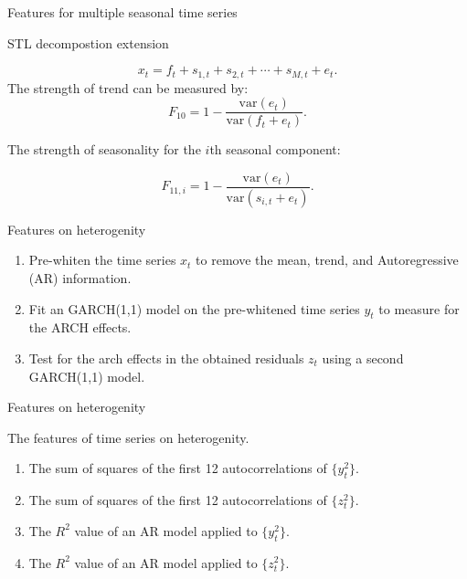 \documentclass[11pt,ignorenonframetext,compress]{beamer}
\providecommand{\tightlist}{%
  \setlength{\itemsep}{0pt}\setlength{\parskip}{0pt}}
\begin{document}
\begin{frame}{Features for multiple seasonal time series}

  \begin{block}{STL decompostion extension}

    \[ x_t = f_t + s_{1,t} + s_{2,t} + \cdots + s_{M,t} + e_t.\] The
    strength of trend can be measured by: \[
      F_{10} = 1- \frac{\text{var}(e_t)}{\text{var}(f_t + e_t)}.
    \]

    The strength of seasonality for the \(i\)th seasonal component:

    \[
      F_{11,i} = 1- \frac{\text{var}(e_t)}{\text{var}(s_{i,t} + e_t)}.
    \]

  \end{block}

\end{frame}

\begin{frame}{Features on heterogenity}

  \begin{enumerate}
    \def\labelenumi{\arabic{enumi}.}
    \tightlist
  \item
    Pre-whiten the time series \(x_t\) to remove the mean, trend, and
    Autoregressive (AR) information.
  \item
    Fit an GARCH(1,1) model on the pre-whitened time series \(y_t\) to
    measure for the ARCH effects.
  \item
    Test for the arch effects in the obtained residuals \(z_t\) using a
    second GARCH(1,1) model.
  \end{enumerate}

\end{frame}

\begin{frame}{Features on heterogenity}


  \begin{alertblock}{The features of time series on heterogenity.}
    \begin{enumerate}
    \item The sum of squares of the first 12 autocorrelations of $\{y_t^2\}$.
    \item The sum of squares of the first 12 autocorrelations of $\{z_t^2\}$.
    \item The $R^2$ value of an AR model applied to $\{y_t^2\}$.
    \item The $R^2$ value of an AR model applied to $\{z_t^2\}$.
    \end{enumerate}
  \end{alertblock}

\end{frame}
\end{document}
